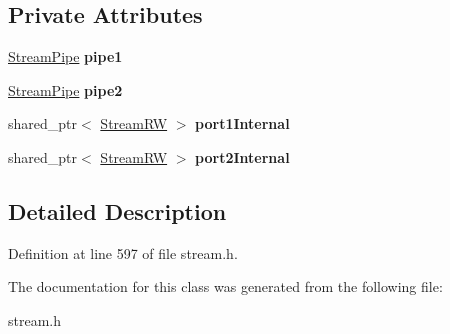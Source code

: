 \subsection*{Private Attributes}
\begin{DoxyCompactItemize}
\item 
\hypertarget{classStreamBidirectionalPipe_a02c657a9e5d36b88ecc2910ef98e8ef7}{\hyperlink{classStreamPipe}{Stream\+Pipe} {\bfseries pipe1}}\label{classStreamBidirectionalPipe_a02c657a9e5d36b88ecc2910ef98e8ef7}

\item 
\hypertarget{classStreamBidirectionalPipe_a4302e990d9d9c347cbc9aab241d6c3c9}{\hyperlink{classStreamPipe}{Stream\+Pipe} {\bfseries pipe2}}\label{classStreamBidirectionalPipe_a4302e990d9d9c347cbc9aab241d6c3c9}

\item 
\hypertarget{classStreamBidirectionalPipe_ade8466b291f8b1f53770b749de505c9c}{shared\+\_\+ptr$<$ \hyperlink{structStreamRW}{Stream\+R\+W} $>$ {\bfseries port1\+Internal}}\label{classStreamBidirectionalPipe_ade8466b291f8b1f53770b749de505c9c}

\item 
\hypertarget{classStreamBidirectionalPipe_a9f65d30fe5a0011ce0c51907babf8f01}{shared\+\_\+ptr$<$ \hyperlink{structStreamRW}{Stream\+R\+W} $>$ {\bfseries port2\+Internal}}\label{classStreamBidirectionalPipe_a9f65d30fe5a0011ce0c51907babf8f01}

\end{DoxyCompactItemize}


\subsection{Detailed Description}


Definition at line 597 of file stream.\+h.



The documentation for this class was generated from the following file\+:\begin{DoxyCompactItemize}
\item 
stream.\+h\end{DoxyCompactItemize}
